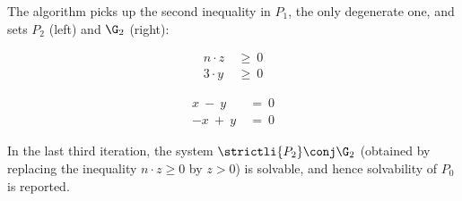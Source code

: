 \begin{slexample}
\noindent
The algorithm picks up the second inequality in $P_1$, the only degenerate one, and sets
$P_2$ (left) and $\G_2$ (right):

\begin{minipage}{0.5\linewidth}
\begin{align*}
n \cdot z  & \ \geq \ 0\\
3 \cdot y  & \ \geq \ 0
\end{align*}
\vspace{-2mm}
\end{minipage}
\begin{minipage}{0.5\linewidth}
\begin{align*}
x \ - \ y  & \ = \ 0 \\
-x  \ + \ y & \ = \ 0
\end{align*}
\vspace{-2mm}
\end{minipage}

\noindent
In the last third iteration, the system $\strictli {P_2} \conj \G_2$ 
(obtained by replacing the inequality $n\cdot z\geq 0$ by $z > 0$)
is solvable, and hence solvability of $P_0$ is reported.
\end{slexample}

%
%

%

%
%

